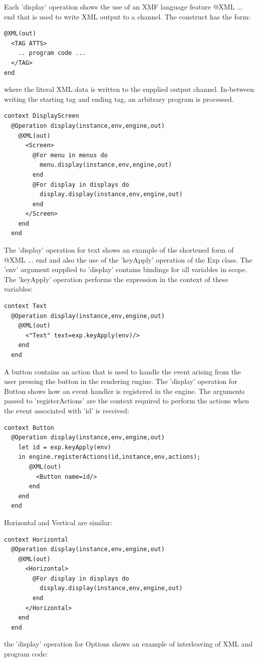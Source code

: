Each 'display' operation shows the use of an XMF language feature
@XML ... end that is used to write XML output to a channel. The construct
has the form:

\begin{lstlisting}
@XML(out)
  <TAG ATTS>
    .. program code ...
  </TAG>
end
\end{lstlisting}where the literal XML data is written to the supplied output channel.
In-between writing the starting tag and ending tag, an arbitrary program
is processed.

\begin{lstlisting}
context DisplayScreen
  @Operation display(instance,env,engine,out)
    @XML(out)
      <Screen>
        @For menu in menus do
          menu.display(instance,env,engine,out)
        end
        @For display in displays do
          display.display(instance,env,engine,out)
        end
      </Screen>
    end
  end
\end{lstlisting}The 'display' operation for text shows an example of the shortened
form of @XML ... end and also the use of the 'keyApply' operation
of the Exp class. The 'env' argument supplied to 'display' contains
bindings for all variables in scope. The 'keyApply' operation performs
the expression in the context of these variables:

\begin{lstlisting}
context Text
  @Operation display(instance,env,engine,out)
    @XML(out)
      <"Text" text=exp.keyApply(env)/>
    end
  end
\end{lstlisting}A button contains an action that is used to handle the event arising
from the user pressing the button in the rendering engine. The 'display'
operation for Button shows how an event handler is registered in the
engine. The arguments passed to 'registerActions' are the context
required to perform the actions when the event associated with 'id'
is received:

\begin{lstlisting}
context Button
  @Operation display(instance,env,engine,out)
    let id = exp.keyApply(env)
    in engine.registerActions(id,instance,env,actions);
       @XML(out)
         <Button name=id/>
       end
    end
  end
\end{lstlisting}Horizontal and Vertical are similar:

\begin{lstlisting}
context Horizontal
  @Operation display(instance,env,engine,out)
    @XML(out)
      <Horizontal>
        @For display in displays do
          display.display(instance,env,engine,out)
        end
      </Horizontal>
    end
  end
\end{lstlisting}the 'display' operation for Options shows an example of interleaving
of XML and program code:

